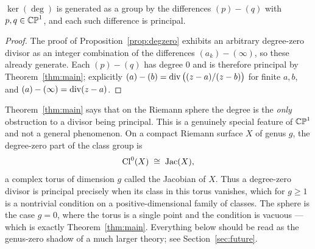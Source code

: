 \begin{smjcorollary}\label{cor:generators}
$\ker(\deg)$ is generated as a group by the differences $(p) - (q)$ with
$p, q \in \mathbb{CP}^1$, and each such difference is principal.
\end{smjcorollary}

\begin{proof}
The proof of Proposition~\ref{prop:degzero} exhibits an arbitrary degree-zero
divisor as an integer combination of the differences $(a_k) - (\infty)$, so these
already generate. Each $(p)-(q)$ has degree $0$ and is therefore principal by
Theorem~\ref{thm:main}; explicitly $(a)-(b) = \operatorname{div}\big((z-a)/(z-b)\big)$ for
finite $a, b$, and $(a) - (\infty) = \operatorname{div}(z-a)$.
\end{proof}

\begin{remark}\label{rem:genus}
Theorem~\ref{thm:main} says that on the Riemann sphere the degree is the
\emph{only} obstruction to a divisor being principal. This is a genuinely special
feature of $\mathbb{CP}^1$ and not a general phenomenon. On a compact Riemann surface $X$
of genus $g$, the degree-zero part of the class group is
\[
\operatorname{Cl}^0(X) \;\cong\; \operatorname{Jac}(X),
\]
a complex torus of dimension $g$ called the Jacobian of $X$. Thus a degree-zero
divisor is principal precisely when its class in this torus vanishes, which for
$g \geq 1$ is a nontrivial condition on a positive-dimensional family of classes.
The sphere is the case $g = 0$, where the torus is a single point and the
condition is vacuous --- which is exactly Theorem~\ref{thm:main}. Everything
below should be read as the genus-zero shadow of a much larger theory; see
Section~\ref{sec:future}.
\end{remark}

